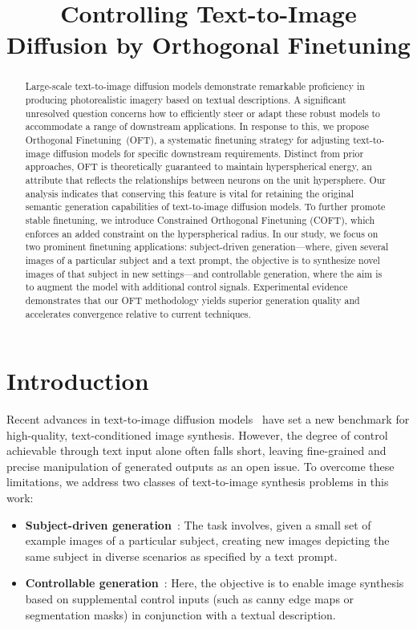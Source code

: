 \title{Controlling Text-to-Image Diffusion by Orthogonal Finetuning}

\begin{abstract}
Large-scale text-to-image diffusion models demonstrate remarkable proficiency in producing photorealistic imagery based on textual descriptions. A significant unresolved question concerns how to efficiently steer or adapt these robust models to accommodate a range of downstream applications. In response to this, we propose Orthogonal Finetuning~(OFT), a systematic finetuning strategy for adjusting text-to-image diffusion models for specific downstream requirements. Distinct from prior approaches, OFT is theoretically guaranteed to maintain hyperspherical energy, an attribute that reflects the relationships between neurons on the unit hypersphere. Our analysis indicates that conserving this feature is vital for retaining the original semantic generation capabilities of text-to-image diffusion models. To further promote stable finetuning, we introduce Constrained Orthogonal Finetuning (COFT), which enforces an added constraint on the hyperspherical radius. In our study, we focus on two prominent finetuning applications: subject-driven generation—where, given several images of a particular subject and a text prompt, the objective is to synthesize novel images of that subject in new settings—and controllable generation, where the aim is to augment the model with additional control signals. Experimental evidence demonstrates that our OFT methodology yields superior generation quality and accelerates convergence relative to current techniques.
\end{abstract}

\section{Introduction}

Recent advances in text-to-image diffusion models~\cite{saharia2022photorealistic,ramesh2022hierarchical,rombach2022high} have set a new benchmark for high-quality, text-conditioned image synthesis. However, the degree of control achievable through text input alone often falls short, leaving fine-grained and precise manipulation of generated outputs as an open issue. To overcome these limitations, we address two classes of text-to-image synthesis problems in this work:

\begin{itemize}[leftmargin=*,nosep]

    \item \textbf{Subject-driven generation}~\cite{ruiz2023dreambooth}: The task involves, given a small set of example images of a particular subject, creating new images depicting the same subject in diverse scenarios as specified by a text prompt.
    \item \textbf{Controllable generation}~\cite{zhang2023adding,mou2023t2i}: Here, the objective is to enable image synthesis based on supplemental control inputs (such as canny edge maps or segmentation masks) in conjunction with a textual description.
\end{itemize}

